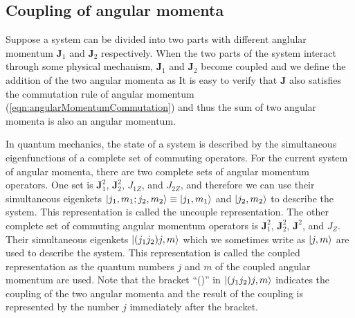 \subsection{Coupling of angular momenta}

Suppose a system can be divided into two parts with different anglular momentum $\mathbf{J}_1$ and $\mathbf{J}_2$ 
respectively. When the two parts of the system interact through some physical mechanism, $\mathbf{J}_1$ and 
$\mathbf{J}_2$ become coupled and we define the addition of the two angular momenta as
It is easy to verify that $\mathbf{J}$ also satisfies the commutation rule of angular momentum
 (\autoref{eqn:angularMomentumCommutation}) and thus the sum of two angular momenta  is also an angular momentum.

In quantum mechanics, the state of a system is described by the simultaneous eigenfunctions of a complete set of 
commuting operators. For the current system of angular momenta, there are two complete sets of angular momentum
operators.  One set is $\mathbf{J}_1^2$, $\mathbf{J}_2^2$, $J_{1Z}$, and $J_{2Z}$, and therefore we can use their
simultaneous eigenkets $| j_1, m_1; j_2, m_2 \rangle\equiv | j_1, m_1 \rangle$ and $| j_2, m_2 \rangle$ to describe the system.
This representation is called the uncouple representation. The other complete set of commuting angular 
 momentum operators is $\mathbf{J}_1^2$, $\mathbf{J}_2^2$, $\mathbf{J}^2$, and $J_Z$. Their simultaneous 
 eigenkets $| (j_1 j_2)j, m \rangle$ which we sometimes write as $| j, m \rangle$ are used to describe the system. This
  representation is called the coupled representation as the quantum numbers $j$ and $m$ of the coupled angular 
  momentum are used. Note that the bracket ``()'' in $| (j_1 j_2)j, m \rangle$ indicates the coupling of the two 
  angular momenta and the result of the coupling is represented by the number $j$ immediately after the bracket.

